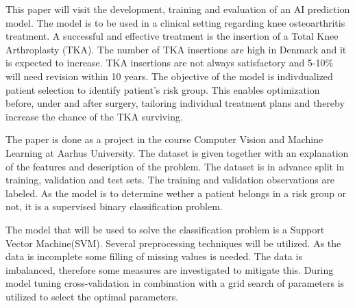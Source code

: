 
This paper will visit the development, training and evaluation of an AI prediction model. The model is to be used in a clinical setting regarding knee osteoarthritis treatment. A successful and effective treatment is the insertion of a Total Knee Arthroplasty (TKA). The number of TKA insertions are high in Denmark and it is expected to increase. TKA insertions are not always satisfactory and 5-10\% will need revision within 10 years. The objective of the model is indivdualized patient selection to identify patient's risk group. This enables optimization before, under and after surgery, tailoring  individual treatment plans and thereby increase the chance of the TKA surviving\cite{problem-description}.           

The paper is done as a project in the course Computer Vision and Machine Learning at Aarhus University. The dataset is given together with an explanation of the features and description of the problem. The dataset is in advance split in training, validation and test sets. The training and validation observations are labeled. As the model is to determine wether a patient belongs in a risk group or not, it is a supervised binary classification problem.

The model that will be used to solve the classification problem is a Support Vector Machine(SVM). Several preprocessing techniques will be utilized. As the data is incomplete some filling of missing values is needed. The data is imbalanced, therefore some measures are investigated to mitigate this. During model tuning cross-validation in combination with a grid search of parameters is utilized to select the optimal parameters.  
